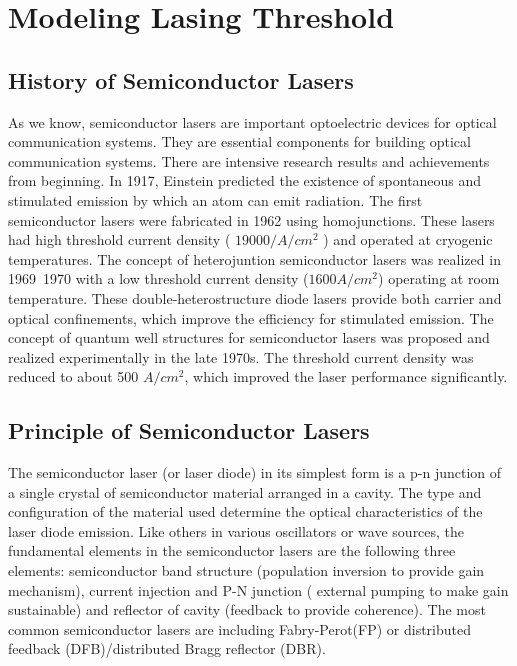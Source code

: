 \chapter{Modeling Lasing Threshold} \label{LT}


\section{History of Semiconductor Lasers} \label{corrections} 

As we know, semiconductor lasers are important optoelectric devices for optical
communication systems. They are essential components for building optical
communication systems. There are intensive research results and achievements
from beginning.  In 1917, Einstein predicted the existence of spontaneous and
stimulated emission by which an atom can emit radiation. The first
semiconductor lasers were fabricated in 1962 using homojunctions. These lasers
had high threshold current density ( $19000/A/{cm}^2$ ) and operated at
cryogenic temperatures.  The concept of heterojuntion semiconductor lasers was
realized in 1969~1970 with a low threshold current density ($1600 A/{cm}^2$)
operating at room temperature. These double-heterostructure diode lasers
provide both carrier and optical confinements, which improve the efficiency for
stimulated emission.  The concept of quantum well structures for semiconductor
lasers was proposed and realized experimentally in the late 1970s. The
threshold current density was reduced to about 500 $A/{cm}^2$, which improved
the laser performance significantly.

\section{Principle of Semiconductor Lasers} \label{corrections}

The semiconductor laser (or laser diode) in its simplest form is a
p-n junction of a single crystal of semiconductor material arranged in a
cavity.%
The type and configuration of the material used
determine the optical characteristics of the laser diode emission. Like others
in various oscillators or wave sources, the fundamental elements in the
semiconductor lasers are the following three elements: semiconductor band
structure (population inversion to provide gain mechanism), current injection
and P-N junction ( external pumping to make gain sustainable) and reflector of
cavity (feedback to provide coherence). The most common semiconductor lasers
are including Fabry-Perot(FP) or distributed feedback (DFB)/distributed Bragg
reflector (DBR).

